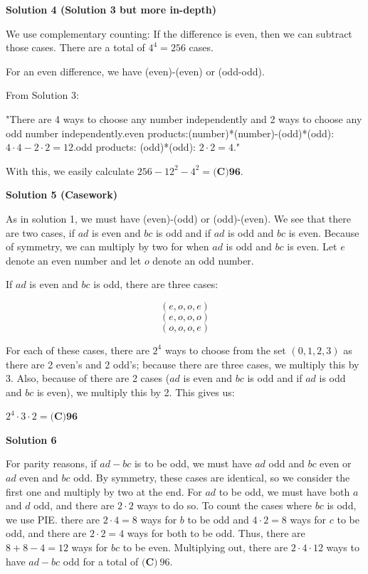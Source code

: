 \begin{enumerate}
 



\textbf{Solution 4 (Solution 3 but more in-depth)}

We use complementary counting: If the difference is even, then we can subtract those cases. There are a total of $4^4=256$ cases.

 For an even difference, we have (even)-(even) or (odd-odd). 

 From Solution 3:

 "There are 4 ways to choose any number independently and 2 ways to choose any odd number independently.even products:(number)*(number)-(odd)*(odd): $4 \cdot 4 - 2 \cdot 2=12$.odd products: (odd)*(odd): $2 \cdot 2 =4$."

 With this, we easily calculate $256-12^2-4^2=\textbf{(C)96}$.

 



\textbf{Solution 5 (Casework)}

As in solution 1, we must have (even)-(odd) or (odd)-(even). We see that there are two cases, if $ad$ is even and $bc$ is odd and if $ad$ is odd and $bc$ is even. Because of symmetry, we can multiply by two for when $ad$ is odd and $bc$ is even. Let $e$ denote an even number and let $o$ denote an odd number. 

 If $ad$ is even and $bc$ is odd, there are three cases:

 

 \[(e,o,o,e)\]
 \[(e,o,o,o)\]
 \[(o,o,o,e)\]

 
For each of these cases, there are $2^4$ ways to choose from the set $(0,1,2,3)$ as there are 2 even's and 2 odd's; because there are three cases, we multiply this by 3. Also, because of there are 2 cases ($ad$ is even and $bc$ is odd and if $ad$ is odd and $bc$ is even), we multiply this by 2. This gives us:

 $2^4 \cdot 3 \cdot 2= \textbf{(C)96}$




\textbf{Solution 6}

For parity reasons, if $ad - bc$ is to be odd, we must have $ad$ odd and $bc$ even or $ad$ even and $bc$ odd. By symmetry, these cases are identical, so we consider the first one and multiply by two at the end. For $ad$ to be odd, we must have both $a$ and $d$ odd, and there are $2 \cdot 2$ ways to do so. To count the cases where $bc$ is odd, we use PIE. there are $2 \cdot 4 = 8$ ways for $b$ to be odd and $4 \cdot 2 = 8$ ways for $c$ to be odd, and there are $2 \cdot 2 = 4$ ways for both to be odd. Thus, there are $8 + 8 - 4 = 12$ ways for $bc$ to be even. Multiplying out, there are $2 \cdot 4 \cdot 12$ ways to have $ad - bc$ odd for a total of $\boxed{\textbf{(C)}~96}$.


\end{enumerate}
